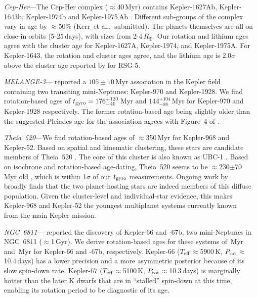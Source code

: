 \documentclass[11pt,twocolumn,tighten,linenumbers,trackchanges]{aastex63}
\begin{document}
{\it Cep-Her}---The Cep-Her complex ($\approx$40\,Myr) contains
Kepler-1627Ab, Kepler-1643b, Kepler-1974b and Kepler-1975\,Ab
\citep{Bouma_2022a,Bouma_2022b}.  Different sub-groups of the complex
vary in age by $\approx$50\% (Kerr~et al.,~submitted).  The planets
themselves are all on close-in orbits (5-25\,days), with sizes from
2-4\,$R_\oplus$.  Our rotation and lithium ages agree with the cluster
age for Kepler-1627A, Kepler-1974, and Kepler-1975A.  For Kepler-1643,
the rotation and cluster ages agree, and the lithium age is
2.0$\sigma$ above the cluster age reported by \citet{Bouma_2022b} for
RSG-5.

{\it MELANGE-3}---\citet{Barber_2022} reported a $105\pm10$\,Myr
association in the Kepler field containing two transiting
mini-Neptunes: Kepler-970 and Kepler-1928.  We find rotation-based
ages of $t_{\rm gyro}=176_{-40}^{+120}$\,Myr and
$144_{-88}^{+104}$\,Myr for Kepler-970 and Kepler-1928 respectively.
The former rotation-based age being slightly older than the suggested
Pleiades age for the association agrees with Figure~4 of
\citet{Barber_2022}.

{\it Theia~520}---We find rotation-based ages of $\approx$350\,Myr
for Kepler-968 and Kepler-52.  Based on spatial and kinematic
clustering, these stars are candidate 
members of Theia~520 \citep{2019AJ....158..122K}.  The core of this cluster is also known
as UBC-1 \citep{2018A&A...618A..59C}.  Based on isochrone and
rotation-based age-dating, Theia~520 seems to be
$\approx$230$\pm$70\,Myr old
\citep{2024A&A...681A..13F}, which is within
1$\sigma$ of our $t_{\rm gyro}$ measurements.  Ongoing work by
\citet{Curtis2024} broadly finds that the two planet-hosting stars are
indeed members of this diffuse population.  Given the cluster-level
and individual-star evidence, this makes Kepler-968 and Kepler-52 the
youngest multiplanet systems currently known from the main Kepler
mission.

{\it NGC~6811}---\citet{Meibom_2013} reported the discovery of
Kepler-66 and -67b, two mini-Neptunes in NGC~6811 ($\approx$1\,Gyr).
We derive rotation-based ages for these systems of
\kepsixsixtgyro\,Myr and \kepsixseventgyro\,Myr for Kepler-66 and
-67b, respectively.  Kepler-66 ($T_{\rm eff}$$\approx$5900\,K, $P_{\rm
rot}$$\approx$10.4\,days) has a lower precision and a more asymmetric
posterior because of its slow spin-down rate.  Kepler-67 ($T_{\rm
eff}$$\approx$5100\,K, $P_{\rm rot}$$\approx$10.3\,days) is marginally
hotter than the later K dwarfs that are in ``stalled'' spin-down at
this time, enabling its rotation period to be diagnostic of its age.
\end{document}

